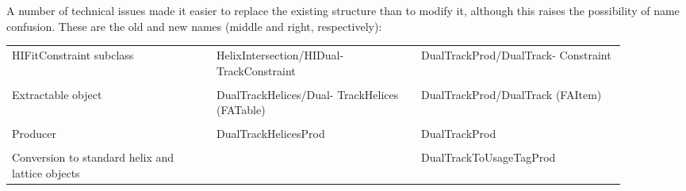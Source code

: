 \documentclass[12pt]{article}
\begin{document}
A number of technical issues made it easier to replace the existing
structure than to modify it, although this raises the possibility of
name confusion.  These are the old and new names (middle and right,
respectively):
\begin{center}
  \begin{tabular}{p{0.3\linewidth} | p{0.3\linewidth} | p{0.3\linewidth}}
    \begin{minipage}{\linewidth} HIFitConstraint subclass \end{minipage} &
      \begin{minipage}{\linewidth} HelixIntersection/HIDual- TrackConstraint \end{minipage} &
        \begin{minipage}{\linewidth} DualTrackProd/DualTrack- Constraint \end{minipage} \\
    & & \\
    \begin{minipage}{\linewidth} Extractable object \end{minipage} &
      \begin{minipage}{\linewidth} DualTrackHelices/Dual- TrackHelices (FATable) \end{minipage} &
        \begin{minipage}{\linewidth} DualTrackProd/DualTrack (FAItem) \end{minipage} \\
    & & \\
    \begin{minipage}{\linewidth} Producer \end{minipage} &
      \begin{minipage}{\linewidth} DualTrackHelicesProd \end{minipage} &
        \begin{minipage}{\linewidth} DualTrackProd \end{minipage} \\
    & & \\
    \begin{minipage}{\linewidth} Conversion to standard helix and lattice objects \end{minipage} &
      &
        \begin{minipage}{\linewidth} DualTrackToUsageTagProd \end{minipage} \\
  \end{tabular}
\end{center}
\end{document}
